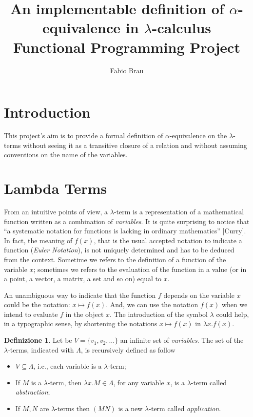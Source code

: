 \documentclass[a4paper,11pt]{article}
\title{An implementable definition of $\alpha$-equivalence in
$\lambda$-calculus\\
{\large Functional Programming Project}}
\author{Fabio Brau}
\theoremstyle{definition}
\newtheorem{defn}{Definizione}
\begin{document}
\maketitle
\tableofcontents
\section{Introduction}


This project's aim is to provide a formal definition of $\alpha$-equivalence
on the $\lambda$-terms without seeing it as a transitive closure of a
relation and without assuming conventions on the name of the variables.


\section{Lambda Terms}
From an intuitive points of view, a $\lambda$-term is a representation of
a mathematical function written as a combination of \textit{variables}. It
is quite surprising to notice that ``a systematic notation for functions is lacking
in ordinary mathematics'' [Curry]. In fact, the meaning of $f(x)$, that is the usual
accepted notation to indicate a function (\textit{Euler Notation}), is not uniquely
determined and has to be deduced from the context. Sometime we refers to the
definition of  a function of the variable $x$; sometimes we refers to the
evaluation of the function in a value (or in a point, a vector, a matrix, a
set and so on) equal to $x$.

An unambiguous way to indicate that the function $f$ depends on the variable $x$ 
could be the notation: $x\mapsto f(x)$. And, we can use the notation $f(x)$
when we intend to evaluate $f$ in the object $x$. The introduction of the
symbol $\lambda$ could help, in a typographic sense, by shortening the
notations $x\mapsto f(x)$ in $\lambda x.f(x)$.

\begin{defn}
  Let be $V=\{v_1,v_2,\dots\}$ an infinite set of \textit{variables}. The
  set of the $\lambda$-terms, indicated with $\Lambda$, is recursively
  defined as follow
  \begin{itemize}
    \item $V\subseteq\Lambda$, i.e., each variable is a $\lambda$-term;
    \item If $M$ is a $\lambda$-term, then $\lambda x.M\in\Lambda$, for any variable
      $x$, is a $\lambda$-term called \textit{abstraction};
    \item If $M,N$ are $\lambda$-terms then $(MN)$ is a new $\lambda$-term
      called \textit{application}.
  \end{itemize}
\end{defn}
\end{document}
